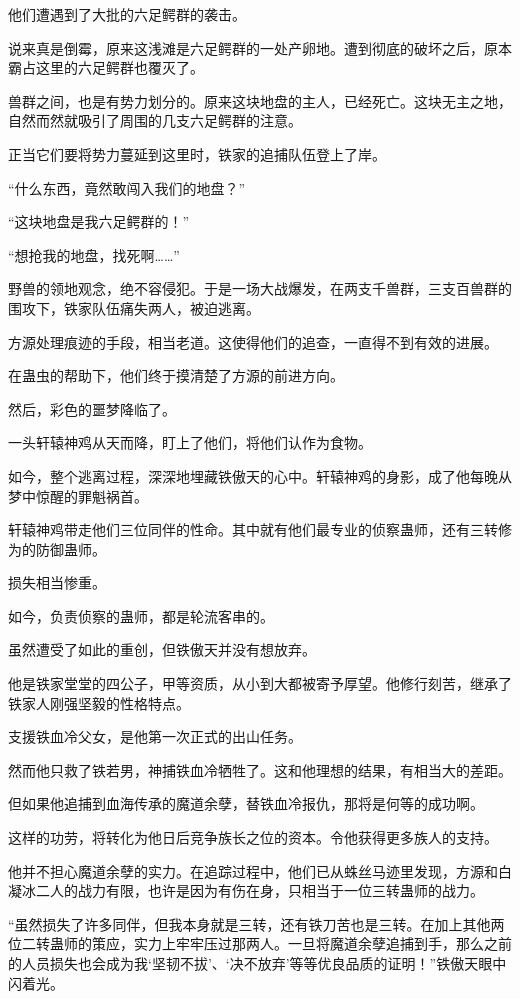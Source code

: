 \begin{this_body}
他们遭遇到了大批的六足鳄群的袭击。

说来真是倒霉，原来这浅滩是六足鳄群的一处产卵地。遭到彻底的破坏之后，原本霸占这里的六足鳄群也覆灭了。

兽群之间，也是有势力划分的。原来这块地盘的主人，已经死亡。这块无主之地，自然而然就吸引了周围的几支六足鳄群的注意。

正当它们要将势力蔓延到这里时，铁家的追捕队伍登上了岸。

“什么东西，竟然敢闯入我们的地盘？”

“这块地盘是我六足鳄群的！”

“想抢我的地盘，找死啊……”

野兽的领地观念，绝不容侵犯。于是一场大战爆发，在两支千兽群，三支百兽群的围攻下，铁家队伍痛失两人，被迫逃离。

方源处理痕迹的手段，相当老道。这使得他们的追查，一直得不到有效的进展。

在蛊虫的帮助下，他们终于摸清楚了方源的前进方向。

然后，彩色的噩梦降临了。

一头轩辕神鸡从天而降，盯上了他们，将他们认作为食物。

如今，整个逃离过程，深深地埋藏铁傲天的心中。轩辕神鸡的身影，成了他每晚从梦中惊醒的罪魁祸首。

轩辕神鸡带走他们三位同伴的性命。其中就有他们最专业的侦察蛊师，还有三转修为的防御蛊师。

损失相当惨重。

如今，负责侦察的蛊师，都是轮流客串的。

虽然遭受了如此的重创，但铁傲天并没有想放弃。

他是铁家堂堂的四公子，甲等资质，从小到大都被寄予厚望。他修行刻苦，继承了铁家人刚强坚毅的性格特点。

支援铁血冷父女，是他第一次正式的出山任务。

然而他只救了铁若男，神捕铁血冷牺牲了。这和他理想的结果，有相当大的差距。

但如果他追捕到血海传承的魔道余孽，替铁血冷报仇，那将是何等的成功啊。

这样的功劳，将转化为他日后竞争族长之位的资本。令他获得更多族人的支持。

他并不担心魔道余孽的实力。在追踪过程中，他们已从蛛丝马迹里发现，方源和白凝冰二人的战力有限，也许是因为有伤在身，只相当于一位三转蛊师的战力。

“虽然损失了许多同伴，但我本身就是三转，还有铁刀苦也是三转。在加上其他两位二转蛊师的策应，实力上牢牢压过那两人。一旦将魔道余孽追捕到手，那么之前的人员损失也会成为我‘坚韧不拔’、‘决不放弃’等等优良品质的证明！”铁傲天眼中闪着光。


\end{this_body}
